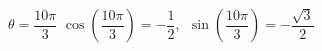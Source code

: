 {$\theta = \dfrac{10\pi}{3}$}
{$\cos\left(\dfrac{10\pi}{3}\right) = -\dfrac{1}{2}$, $\; \sin \left(\dfrac{10\pi}{3}\right) = -\dfrac{\sqrt{3}}{2}$}
